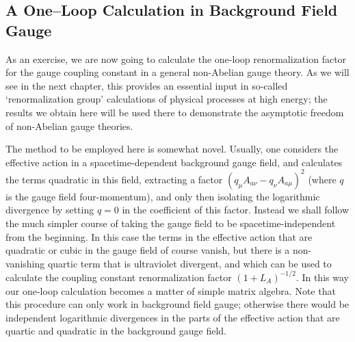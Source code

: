 \subsection{A One--Loop Calculation in Background Field Gauge}

As an exercise, we are now going to calculate the one-loop renormalization
factor for the gauge coupling constant in a general non-Abelian gauge
theory. As we will see in the next chapter, this provides an essential input
in so-called `renormalization group' calculations of physical processes at
high energy; the results we obtain here will be used there to demonstrate
the asymptotic freedom of non-Abelian gauge theories.

The method to be employed here is somewhat novel. Usually, one
considers the effective action in a spacetime-dependent background gauge
field, and calculates the terms quadratic in this field, extracting a factor
$(q_\mu A_{a\nu}-q_\nu A_{a\mu})^2$ (where $q$ is the gauge field
four-momentum), and only then isolating the logarithmic divergence by setting
$q=0$ in the coefficient of this factor. Instead we shall follow the much
simpler course of taking the gauge field to be spacetime-independent from the
beginning. In this case the terms in the effective action that are quadratic
or cubic in the gauge field of course vanish, but there is a non-vanishing
quartic term that is ultraviolet divergent, and which can be used to calculate
the coupling constant renormalization factor $(1+L_A)^{-1/2}$. In this way our
one-loop calculation becomes a matter of simple matrix algebra. Note that
this procedure can only work in background field gauge; otherwise there
would be independent logarithmic divergences in the parts of the effective
action that are quartic and quadratic in the background gauge field.

